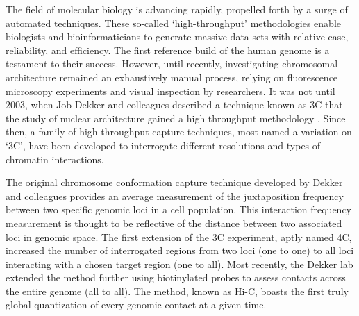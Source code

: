 The field of molecular biology is advancing rapidly, propelled forth by a surge of automated techniques.  These so-called `\gls{high-throughput}'
methodologies enable biologists and bioinformaticians to generate massive data sets with relative ease, reliability, and efficiency.  The first
reference build of the human genome is a testament to their success\cite{hgsc2004}.  However, until recently, investigating chromosomal architecture
remained an exhaustively manual process, relying on fluorescence microscopy experiments and visual inspection by researchers.  It was not until 2003,
when Job Dekker and colleagues described a technique known as \gls{3C} that the study of nuclear architecture gained a high throughput methodology
\cite{dekker2002}. Since then, a family of high-throughput capture techniques, most named a variation on `\gls{3C}', have been developed to interrogate
different resolutions and types of chromatin interactions.

The original chromosome conformation capture technique developed by Dekker and colleagues provides an average measurement of the juxtaposition frequency
between two specific genomic loci in a cell population\cite{frase2014}.  This interaction frequency measurement is thought to be reflective of
the distance between two associated loci in genomic space.  The first extension of the \gls{3C} experiment, aptly named \gls{4C}, increased
the number of interrogated regions from two loci (one to one) to all loci interacting with a chosen target region (one to all)\cite{simonis2006}.  Most
recently, the Dekker lab extended the method further using biotinylated probes to assess contacts across the entire genome (all to all)\cite{berkum2010}.
The method, known as Hi-C, boasts the first truly global quantization of every genomic contact at a given time.

